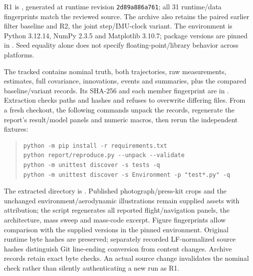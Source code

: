 R1 is , generated at runtime revision \texttt{2d89a886a761}; all 31 runtime/data fingerprints match the reviewed source. The archive also retains the paired earlier filter baseline and R2, the joint step/IMU-clock variant. The environment is Python 3.12.14, NumPy 2.3.5 and Matplotlib 3.10.7; package versions are pinned in . Seed equality alone does not specify floating-point/library behavior across platforms.

The tracked  contains nominal truth, both trajectories, raw measurements, estimates, full covariance, innovations, events and summaries, plus the compared baseline/variant records. Its SHA-256 and each member fingerprint are in . Extraction checks paths and hashes and refuses to overwrite differing files. From a fresh checkout, the following commands unpack the records, regenerate the report's result/model panels and numeric macros, then rerun the independent fixtures:
\begin{quote}\small
\begin{verbatim}
python -m pip install -r requirements.txt
python report/reproduce.py --unpack --validate
python -m unittest discover -s tests -q
python -m unittest discover -s Environment -p "test*.py" -q
\end{verbatim}
\end{quote}
The extracted directory is . Published photograph/press-kit crops and the unchanged environment/aerodynamic illustrations remain supplied assets with attribution; the script regenerates all reported flight/navigation panels, the architecture, mass sweep and mass-code excerpt. Figure fingerprints allow comparison with the supplied versions in the pinned environment. Original runtime byte hashes are preserved; separately recorded LF-normalized source hashes distinguish Git line-ending conversion from content changes. Archive records retain exact byte checks. An actual source change invalidates the nominal check rather than silently authenticating a new run as R1.

